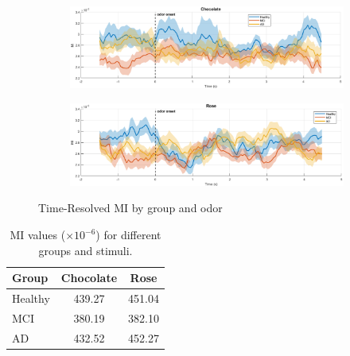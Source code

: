 \documentclass[hidelinks,12pt]{article}
\begin{document}
	\begin{figure}[h!]
		\centering
		\begin{subfigure}[b]{0.85\textwidth}
			\centering
			\includegraphics[width=\textwidth]{19}
		\end{subfigure}
		\vfill
		\begin{subfigure}[b]{0.85\textwidth}
			\centering
			\includegraphics[width=\textwidth]{20}
		\end{subfigure}
		\caption{Time-Resolved MI by group and odor}
	\end{figure}
	\newpage
	\begin{table}[h!]
		\centering
		\begin{tabular}{lcc}
			\hline
			\textbf{Group} & \textbf{Chocolate} & \textbf{Rose} \\
			\hline
			Healthy & 439.27 & 451.04 \\
			MCI     & 380.19 & 382.10 \\
			AD      & 432.52 & 452.27 \\
			\hline
		\end{tabular}
		\caption{MI values ($\times 10^{-6}$) for different groups and stimuli.}
		\label{table:3}
	\end{table}
	
\end{document}
